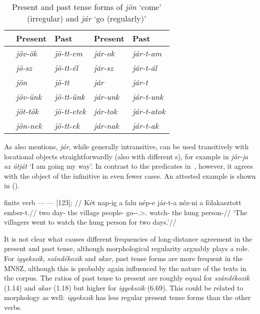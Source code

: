\begin{table}[h!]%
    \centering
    \begin{tabular}{lllll}
    \toprule
              & Present        & Past              & Present       & Past \\
    \midrule
    \Fsg{} & \emph{jöv-ök}  & \emph{jö-tt-em}   & \emph{jár-ok}  & \emph{jár-t-am} \\
    \Ssg{} & \emph{jö-sz}   & \emph{jö-tt-él}   & \emph{jár-sz}  & \emph{jár-t-ál} \\
    \Tsg{} & \emph{jön}     & \emph{jö-tt}      & \emph{jár}     & \emph{jár-t} \\
    \Fpl{} & \emph{jöv-ünk} & \emph{jö-tt-ünk}  & \emph{jár-unk} & \emph{jár-t-unk} \\
    \Spl{} & \emph{jöt-tök} & \emph{jö-tt-etek} & \emph{jár-tok} & \emph{jár-t-atok} \\
    \Tpl{} & \emph{jön-nek} & \emph{jö-tt-ek}   & \emph{jár-nak} & \emph{jár-t-ak} \\
    \bottomrule
    \end{tabular}
    \caption{Present and past tense forms of \emph{jön} \enquote*{come}
    (irregular) and \emph{jár} \enquote*{go (regularly)}}\label{tb:jon-prs-pst}
\end{table}

As \textcite{denDikken2004} also mentions, \emph{jár}, while generally
intransitive, can be used transitively with locational objects
straightforwardly (also with different \Vm{}s), for example in \emph{jár-ja az
útját} \enquote*{I am going my way}.
%
In contrast to the predicates in~, however, it agrees with the
object of the infinitive in even fewer cases. An attested example is shown in
(\nextx).

\ex\label{ex:jarta-nezni}
    \begingl
        \glpreamble finite verb --- \Inf{} --- \Obj{} [123]; //
        \gla 	Két nap-ig a falu nép-e jár-t-a néz-ni a fölakasztott ember-t.//
        \glb 	two day-\Term{} the village people-\Tsg{} go-\Pst-\Tsg.\Sbj>\Third.\Obj{} watch-\Inf{} the hung person-\Acc{}//
        \glft 	\enquote*{The villagers went to watch the hung person for two days.}//
    \endgl
\xe

It is not clear what causes different frequencies of long-distance agreement in
the present and past tense, although morphological regularity arguably plays a
role. For \emph{igyekszik}, \emph{szándékozik} and \emph{akar}, past tense
forms are more frequent in the \gls{MNSZ}, although this is probably again
influenced by the nature of the texts in the corpus. The ratios of past tense
to present are roughly equal for \emph{szándékozik} (1.14) and \emph{akar}
(1.18) but higher for \emph{igyekszik} (6.69). This could be related to
morphology as well: \emph{igyekszik} has less regular present tense forms
than the other verbs.

